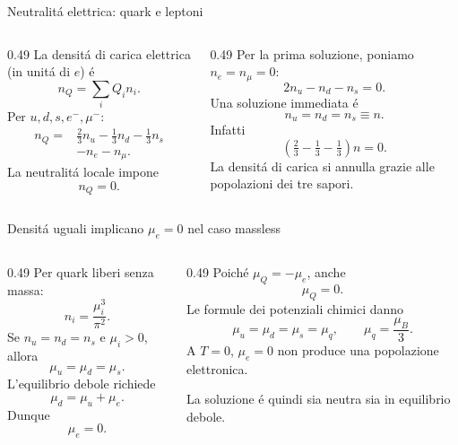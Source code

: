 \begin{frame}[t]{Neutralit\'a elettrica: quark e leptoni}
\small
\begin{columns}[T,onlytextwidth]
\begin{column}{0.49\textwidth}
La densit\'a di carica elettrica (in unit\'a di $e$) \'e
\[
n_Q=\sum_iQ_in_i.
\]
Per $u,d,s,e^-,\mu^-$:
\[
\begin{aligned}
n_Q={}&\tfrac23n_u-\tfrac13n_d-\tfrac13n_s\\
&-n_e-n_\mu.
\end{aligned}
\]
La neutralit\'a locale impone
\[
\boxed{n_Q=0}.
\]
\end{column}
\begin{column}{0.49\textwidth}
Per la prima soluzione, poniamo $n_e=n_\mu=0$:
\[
2n_u-n_d-n_s=0.
\]
Una soluzione immediata \'e
\[
 n_u=n_d=n_s\equiv n.
\]
Infatti
\[
\left(\tfrac23-\tfrac13-\tfrac13\right)n=0.
\]
La densit\'a di carica si annulla grazie alle popolazioni dei tre sapori.
\end{column}
\end{columns}
\end{frame}

\begin{frame}[t]{Densit\'a uguali implicano $\mu_e=0$ nel caso massless}
\small
\begin{columns}[T,onlytextwidth]
\begin{column}{0.49\textwidth}
Per quark liberi senza massa:
\[
n_i=\frac{\mu_i^3}{\pi^2}.
\]
Se $n_u=n_d=n_s$ e $\mu_i>0$, allora
\[
\mu_u=\mu_d=\mu_s.
\]
L'equilibrio debole richiede
\[
\mu_d=\mu_u+\mu_e.
\]
Dunque
\[
\boxed{\mu_e=0}.
\]
\end{column}
\begin{column}{0.49\textwidth}
Poich\'e $\mu_Q=-\mu_e$, anche
\[
\mu_Q=0.
\]
Le formule dei potenziali chimici danno
\[
\boxed{\mu_u=\mu_d=\mu_s=\mu_q},
\qquad \mu_q=\frac{\mu_B}{3}.
\]
A $T=0$, $\mu_e=0$ non produce una popolazione elettronica.

La soluzione \'e quindi sia neutra sia in equilibrio debole.
\end{column}
\end{columns}
\end{frame}

